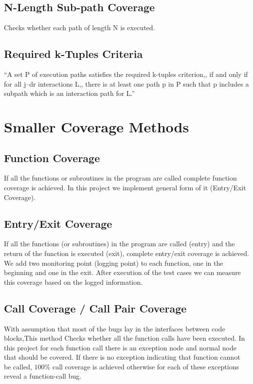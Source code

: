 \documentclass[12pt,a4paper]{report}
\begin{document}
\subsection{N-Length Sub-path Coverage}
Checks whether each path of length N is executed.

\subsection{Required k-Tuples Criteria}
“A set P of execution paths satisfies the required k-tuples criterion,, if and only if for all j–dr interactions L,, there is at least one path p in P such
 that p includes a subpath which is an interaction path for L.”\cite{Zhu:1997:SUT:267580.267590}

\section{Smaller Coverage Methods}

\subsection{Function Coverage}
If all the functions or subroutines in the program are called complete function coverage is achieved.
In this project we implement general form of it (Entry/Exit Coverage).

\subsection{Entry/Exit Coverage}
If all the functions (or subroutines) in the program are called (entry) and the return of the function is executed (exit),  complete entry/exit
 coverage is achieved.
We add two monitoring point (logging point) to each function, one in the beginning and one in the exit. After execution of the test cases we can
 measure this coverage based on the logged information. 

\subsection{Call Coverage / Call Pair Coverage}
With assumption that most of the bugs lay in the interfaces between code blocks,This method Checks whether all the function calls have been executed.
In this project for each function call there is an exception node and normal node that should be covered. If there is no exception indicating that function 
cannot be called, $100\%$ call coverage is achieved otherwise for each of these exceptions reveal a function-call bug.
\end{document}
